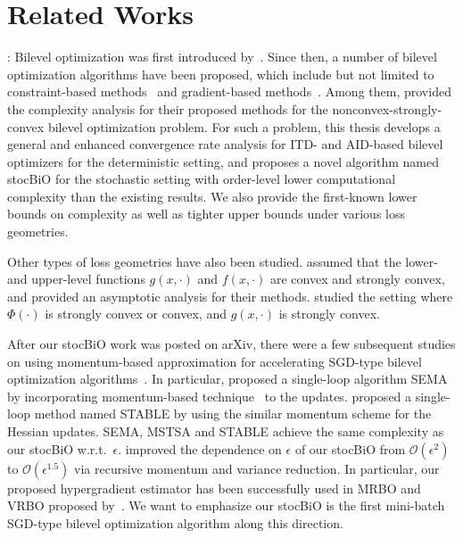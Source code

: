 \documentclass{osudissert96}
\begin{document}
\section{Related Works}
: Bilevel optimization was first introduced by~\cite{bracken1973mathematical}. Since then, a number of bilevel optimization algorithms have been proposed, which include but not limited to constraint-based methods~\cite{shi2005extended,moore2010bilevel} and gradient-based methods~\cite{domke2012generic,pedregosa2016hyperparameter,gould2016differentiating,maclaurin2015gradient,franceschi2018bilevel,ghadimi2018approximation,liao2018reviving,shaban2019truncated,hong2020two,liu2020generic,li2020improved,grazzi2020iteration,lorraine2020optimizing,ji2021lower,liu2021value}. Among them, \cite{ghadimi2018approximation,hong2020two} provided the complexity analysis for their proposed methods for the nonconvex-strongly-convex bilevel optimization problem.
For such a problem, this thesis develops a general and enhanced convergence rate analysis for ITD- and AID-based bilevel optimizers for the deterministic setting, and proposes a novel algorithm named stocBiO for the stochastic setting  with order-level lower computational complexity than the existing results. We also provide the first-known lower  bounds on complexity as well as tighter upper bounds under various loss geometries.  

Other types of loss geometries have also been studied. \cite{liu2020generic,li2020improved} assumed that the lower- and upper-level functions $g(x,\cdot)$ and $f(x,\cdot)$ are convex and strongly convex, and provided an asymptotic analysis for their methods. \cite{ghadimi2018approximation,hong2020two}  studied the setting where $\Phi(\cdot)$ is strongly convex or convex, and  $g(x,\cdot)$ is strongly convex. 


After our stocBiO work was posted on arXiv, there were a few subsequent studies on using momentum-based approximation for accelerating SGD-type bilevel optimization algorithms~\cite{chen2021single,guo2021stochastic,khanduri2021near,guo2021randomized,yang2021provably}. In particular, \cite{guo2021stochastic} proposed a single-loop algorithm SEMA by incorporating momentum-based technique~\cite{cutkosky2019momentum} to the updates. \cite{chen2021single} proposed a single-loop method named STABLE by using the similar momentum scheme for the Hessian updates.
SEMA, MSTSA and STABLE achieve the same complexity as our stocBiO w.r.t.~$\epsilon$. \cite{khanduri2021near,guo2021randomized,yang2021provably} improved the dependence on $\epsilon$ of our stocBiO from $\mathcal{O}(\epsilon^{2})$ to $\mathcal{O}(\epsilon^{1.5})$ via recursive momentum and variance reduction. In particular, our proposed hypergradient estimator has been successfully used in MRBO and VRBO proposed by~\cite{yang2021provably}.  We want to emphasize our stocBiO is the first mini-batch SGD-type bilevel optimization algorithm along this direction. 
\end{document}
